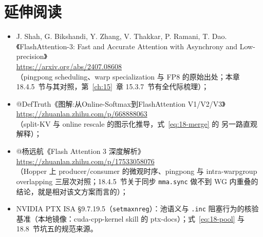 \section*{延伸阅读}

\begin{itemize}
  \item J. Shah, G. Bikshandi, Y. Zhang, V. Thakkar, P. Ramani, T. Dao.
        《FlashAttention-3: Fast and Accurate Attention
        with Asynchrony and Low-precision》\\
        \url{https://arxiv.org/abs/2407.08608}\\
        （pingpong scheduling、warp specialization 与 FP8 的原始出处；本章
        18.4.5~节与其对照，第~\ref{ch:15}~章 15.3.7~节有全代际梳理）；
  \item @DefTruth《图解:从Online-Softmax到FlashAttention V1/V2/V3》\\
        \url{https://zhuanlan.zhihu.com/p/668888063}\\
        （split-KV 与 online rescale 的图示化推导，式~\ref{eq:18-merge} 的
        另一路直观解释）；
  \item @杨远航《Flash Attention 3 深度解析》\\
        \url{https://zhuanlan.zhihu.com/p/17533058076}\\
        （Hopper 上 producer/consumer 的微观时序、pingpong 与
        intra-warpgroup overlapping 三层次对照；18.4.5~节关于同步
        \texttt{mma.sync} 做不到 WG 内重叠的结论，就是相对该文方案而言的）；
  \item NVIDIA PTX ISA §9.7.19.5（\texttt{setmaxnreg}）：池语义与
        \texttt{.inc} 阻塞行为的核验基准（本地镜像：cuda-cpp-kernel skill 的
        ptx-docs）；式~\ref{eq:18-pool} 与 18.8~节坑五的规范来源。
\end{itemize}
